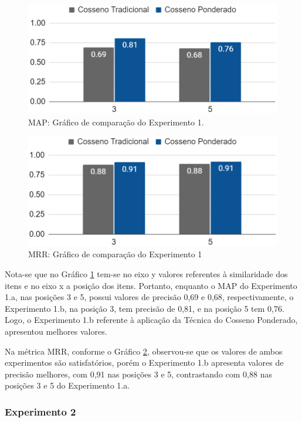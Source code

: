 \documentclass[portuguese]{textolivre}
\begin{document}
\begin{figure}[H]
	\centering
	\includegraphics[scale=0.60]{imagens/fig-021.png} 
	\caption{MAP: Gráfico de comparação do Experimento 1.}
	\label{fig:018}
\end{figure}


\begin{figure}[H]
	\centering
	\includegraphics[scale=0.75]{imagens/fig-022.png}  
	\caption{MRR: Gráfico de comparação do Experimento 1}
	\label{fig:019}
\end{figure} 

Nota-se que no Gráfico \ref{fig:018} tem-se no eixo y valores referentes à similaridade dos itens e no eixo x a posição dos itens. Portanto, enquanto o MAP do Experimento 1.a, nas posições 3 e 5, possui valores de precisão 0,69 e 0,68, respectivamente, o Experimento 1.b, na posição 3, tem precisão de 0,81, e na posição 5 tem 0,76. Logo, o Experimento 1.b referente à aplicação da Técnica do Cosseno Ponderado, apresentou melhores valores.

Na métrica MRR, conforme o Gráfico \ref{fig:019}, observou-se que os valores de ambos experimentos são satisfatórios, porém o Experimento 1.b apresenta valores de precisão melhores, com 0,91 nas posições 3 e 5, contrastando com 0,88 nas posições 3 e 5 do Experimento 1.a.

\subsubsection{Experimento 2}
\end{document}
